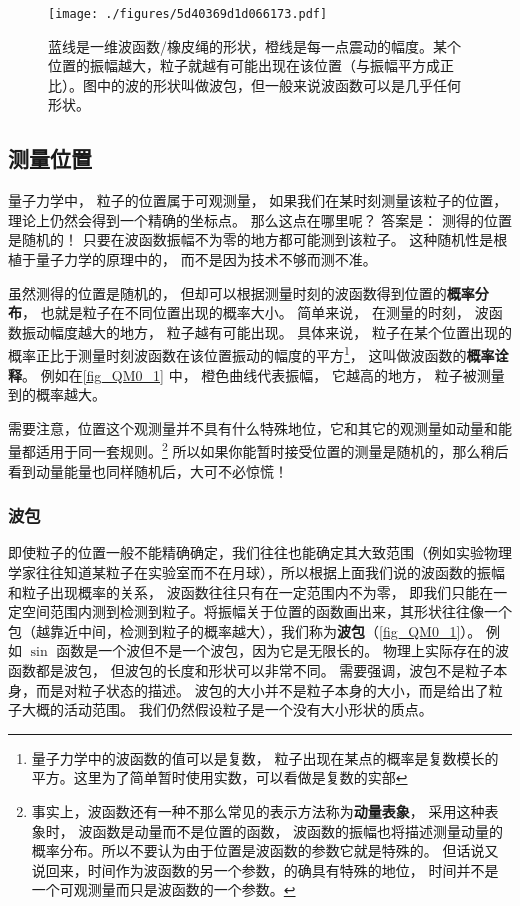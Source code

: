 \begin{figure}[ht]
\centering
\texttt{[image: ./figures/5d40369d1d066173.pdf]}
\caption{蓝线是一维波函数/橡皮绳的形状，橙线是每一点震动的幅度。某个位置的振幅越大，粒子就越有可能出现在该位置（与振幅平方成正比）。图中的波的形状叫做波包，但一般来说波函数可以是几乎任何形状。} \label{fig_QM0_1}
\end{figure}

\subsection{测量位置}

量子力学中， 粒子的位置属于可观测量， 如果我们在某时刻测量该粒子的位置， 理论上仍然会得到一个精确的坐标点。 那么这点在哪里呢？ 答案是： 测得的位置是随机的！ 只要在波函数振幅不为零的地方都可能测到该粒子。 这种随机性是根植于量子力学的原理中的， 而不是因为技术不够而测不准。

虽然测得的位置是随机的， 但却可以根据测量时刻的波函数得到位置的\textbf{概率分布}， 也就是粒子在不同位置出现的概率大小。 简单来说， 在测量的时刻， 波函数振动幅度越大的地方， 粒子越有可能出现。 具体来说， 粒子在某个位置出现的概率正比于测量时刻波函数在该位置振动的幅度的平方\footnote{量子力学中的波函数的值可以是复数， 粒子出现在某点的概率是复数模长的平方。这里为了简单暂时使用实数，可以看做是复数的实部}， 这叫做波函数的\textbf{概率诠释}。 例如在\autoref{fig_QM0_1} 中， 橙色曲线代表振幅， 它越高的地方， 粒子被测量到的概率越大。

需要注意，位置这个观测量并不具有什么特殊地位，它和其它的观测量如动量和能量都适用于同一套规则。\footnote{事实上，波函数还有一种不那么常见的表示方法称为\textbf{动量表象}， 采用这种表象时， 波函数是动量而不是位置的函数， 波函数的振幅也将描述测量动量的概率分布。所以不要认为由于位置是波函数的参数它就是特殊的。 但话说又说回来，时间作为波函数的另一个参数，的确具有特殊的地位， 时间并不是一个可观测量而只是波函数的一个参数。} 所以如果你能暂时接受位置的测量是随机的，那么稍后看到动量能量也同样随机后，大可不必惊慌！

\subsubsection{波包}
即使粒子的位置一般不能精确确定，我们往往也能确定其大致范围（例如实验物理学家往往知道某粒子在实验室而不在月球），所以根据上面我们说的波函数的振幅和粒子出现概率的关系， 波函数往往只有在一定范围内不为零， 即我们只能在一定空间范围内测到检测到粒子。将振幅关于位置的函数画出来，其形状往往像一个包（越靠近中间，检测到粒子的概率越大），我们称为\textbf{波包}（\autoref{fig_QM0_1}）。 例如 $\sin$ 函数是一个波但不是一个波包，因为它是无限长的。 物理上实际存在的波函数都是波包， 但波包的长度和形状可以非常不同。 需要强调，波包不是粒子本身，而是对粒子状态的描述。 波包的大小并不是粒子本身的大小，而是给出了粒子大概的活动范围。 我们仍然假设粒子是一个没有大小形状的质点。

